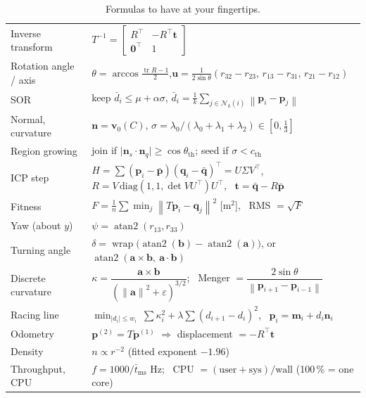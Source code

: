 \documentclass[10pt,a4paper]{scrartcl}
\newcommand{\norm}[1]{\left\lVert #1 \right\rVert}
\DeclareMathOperator{\atantwo}{atan2}
\DeclareMathOperator{\wrap}{wrap}
\DeclareMathOperator{\tr}{tr}
\begin{document}
  \begin{table}[H]
  \small
  \centering
  \renewcommand{\arraystretch}{1.35}
  \begin{tabularx}{\textwidth}{@{}L{3.6cm} X@{}}
  \toprule
  Inverse transform & $T^{-1}=\begin{bmatrix}R^\top&-R^\top\bm t\\\bm 0^\top&1\end{bmatrix}$ \\
  Rotation angle / axis & $\theta=\arccos\frac{\tr R-1}{2}$,\quad $\bm u=\frac{1}{2\sin\theta}(r_{32}-r_{23},\,r_{13}-r_{31},\,r_{21}-r_{12})$ \\
  SOR & keep $\bar d_i\le\mu+\alpha\sigma$, \quad $\bar d_i=\frac1k\sum_{j\in\mathcal N_k(i)}\norm{\bm p_i-\bm p_j}$ \\
  Normal, curvature & $\bm n=\bm v_0(C)$, \quad $\sigma=\lambda_0/(\lambda_0+\lambda_1+\lambda_2)\in[0,\tfrac13]$ \\
  Region growing & join if $\lvert\bm n_s\cdot\bm n_q\rvert\ge\cos\theta_{\text{th}}$; seed if $\sigma<c_{\text{th}}$ \\
  ICP step & $H=\sum(\bm p_i-\bar{\bm p})(\bm q_i-\bar{\bm q})^\top=U\Sigma V^\top$, \ $R=V\,\mathrm{diag}(1,1,\det VU^\top)U^\top$, \ $\bm t=\bar{\bm q}-R\bar{\bm p}$ \\
  Fitness & $F=\frac1n\sum\min_j\norm{T\bm p_i-\bm q_j}^2$ [m$^2$], \ RMS $=\sqrt F$ \\
  Yaw (about $y$) & $\psi=\atantwo(r_{13},r_{33})$ \\
  Turning angle & $\delta=\wrap\big(\atantwo(\bm b)-\atantwo(\bm a)\big)$, or $\atantwo(\bm a\times\bm b,\ \bm a\cdot\bm b)$ \\
  Discrete curvature & $\kappa=\dfrac{\bm a\times\bm b}{(\norm{\bm a}^2+\varepsilon)^{3/2}}$; \ Menger $=\dfrac{2\sin\theta}{\norm{\bm p_{i+1}-\bm p_{i-1}}}$ \\
  Racing line & $\min_{\lvert d_i\rvert\le w_i}\ \sum\kappa_i^2+\lambda\sum(d_{i+1}-d_i)^2$, \ $\bm p_i=\bm m_i+d_i\bm n_i$ \\
  Odometry & $\bm p^{(2)}=T\bm p^{(1)}$ $\Rightarrow$ displacement $=-R^\top\bm t$ \\
  Density & $n\propto r^{-2}$ (fitted exponent $-1.96$) \\
  Throughput, CPU & $f=1000/\bar t_{\text{ms}}$ Hz; \ CPU $=(\text{user}+\text{sys})/\text{wall}$ (100\,\% = one core) \\
  \bottomrule
  \end{tabularx}
  \caption{Formulas to have at your fingertips.}
  \label{tab:formulas}
  \end{table}

  
  

  
\end{document}
